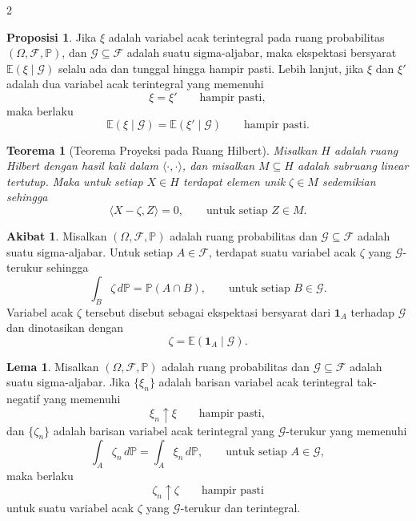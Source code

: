 \documentclass[a4paper,extrafontsizes, 9pt]{memoir}
\theoremstyle{definition}
\newtheorem{lemma}[kalstok]{Lema}
\newtheorem{proposisi}[kalstok]{Proposisi}
\newtheorem{akibat}[kalstok]{Akibat}
\theoremstyle{plain}
\newtheorem{teorema}[kalstok]{Teorema}
\theoremstyle{remark}
\begin{document}
\begin{multicols}{2}
  \begin{proposisi}
    Jika $\xi$ adalah variabel acak terintegral pada ruang probabilitas
    $(\Omega,\mathcal{F},\mathbb{P})$, dan $\mathcal{G}\subseteq\mathcal{F}$ adalah suatu
    sigma-aljabar, maka ekspektasi bersyarat $\mathbb{E}(\xi\mid\mathcal{G})$ selalu ada dan
    tunggal hingga hampir pasti. Lebih lanjut, jika $\xi$ dan $\xi'$ adalah dua variabel acak
    terintegral yang memenuhi
    \[\xi=\xi'\qquad \text{hampir pasti},\]
    maka berlaku
    \[\mathbb{E}(\xi\mid\mathcal{G})=\mathbb{E}(\xi'\mid\mathcal{G})\qquad \text{hampir pasti}.\]
  \end{proposisi}

  \begin{teorema}[Teorema Proyeksi pada Ruang Hilbert]
    Misalkan $H$ adalah ruang Hilbert dengan hasil kali dalam $\langle\cdot,\cdot\rangle$, dan
    misalkan $M\subseteq H$ adalah subruang linear tertutup. Maka untuk setiap $X\in H$ terdapat
    elemen unik $\zeta\in M$ sedemikian sehingga
    \[\langle X-\zeta,Z\rangle=0,\qquad \text{untuk setiap }Z\in M.\]
  \end{teorema}

  \begin{akibat}
    Misalkan $(\Omega,\mathcal{F},\mathbb{P})$ adalah ruang probabilitas dan
    $\mathcal{G}\subseteq\mathcal{F}$ adalah suatu sigma-aljabar. Untuk setiap $A\in\mathcal{F}$,
    terdapat suatu variabel acak $\zeta$ yang $\mathcal{G}$-terukur sehingga
    \[\int_B \zeta\,d\mathbb{P}=\mathbb{P}(A\cap B),\qquad \text{untuk setiap }B\in\mathcal{G}.\]
    Variabel acak $\zeta$ tersebut disebut sebagai ekspektasi bersyarat dari $\mathbf{1}_A$
    terhadap $\mathcal{G}$ dan dinotasikan dengan
    \[\zeta=\mathbb{E}(\mathbf{1}_A\mid\mathcal{G}).\]
  \end{akibat}

  \begin{lemma}
    Misalkan $(\Omega,\mathcal{F},\mathbb{P})$ adalah ruang probabilitas dan
    $\mathcal{G}\subseteq\mathcal{F}$ adalah suatu sigma-aljabar. Jika $\{\xi_n\}$ adalah
    barisan variabel acak terintegral tak-negatif yang memenuhi
    \[\xi_n\uparrow \xi\qquad \text{hampir pasti},\]
    dan $\{\zeta_n\}$ adalah barisan variabel acak terintegral yang $\mathcal{G}$-terukur yang
    memenuhi
    \[\int_A \zeta_n\,d\mathbb{P}=\int_A \xi_n\,d\mathbb{P},\qquad \text{untuk setiap }A\in\mathcal{G},\]
    maka berlaku
    \[\zeta_n\uparrow \zeta\qquad \text{hampir pasti}\]
    untuk suatu variabel acak $\zeta$ yang $\mathcal{G}$-terukur dan terintegral.
  \end{lemma}


\end{multicols}
\end{document}
